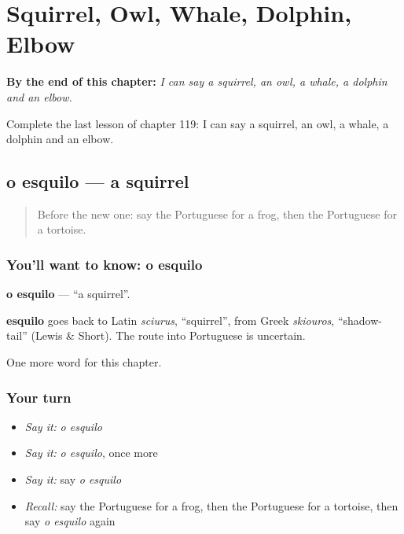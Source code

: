 
\chapter{Squirrel, Owl, Whale, Dolphin, Elbow}
\label{ch:pt-squirrel-owl-whale-dolphin-elbow}

\begin{chapteropening}
\textbf{By the end of this chapter:} \emph{I can say a squirrel, an owl, a whale, a dolphin and an elbow.}

Complete the last lesson of chapter 119: I can say a squirrel, an owl, a whale, a dolphin and an elbow.
\end{chapteropening}

\section[o esquilo]{o esquilo — a squirrel}

\label{lesson:PT-C119-esquilo}



\begin{quote}
Before the new one: say the Portuguese for a frog, then the Portuguese for a tortoise.
\end{quote}

\subsection*{You'll want to know: o esquilo}
\textbf{o esquilo} — \textquotedblleft{}a squirrel\textquotedblright{}.

\begin{cousinweb}
\textbf{esquilo} goes back to Latin \emph{sciurus}, \textquotedblleft{}squirrel\textquotedblright{}, from Greek \emph{skiouros}, \textquotedblleft{}shadow-tail\textquotedblright{} (Lewis \& Short). The route into Portuguese is uncertain.
\end{cousinweb}

\begin{grammarlens}[title={What you've built}]
One more word for this chapter.
\end{grammarlens}

\subsection*{Your turn}
\begin{itemize}
\raggedright
  \item \emph{Say it:} \emph{o esquilo}
  \item \emph{Say it:} \emph{o esquilo}, once more
  \item \emph{Say it:} say \emph{o esquilo}
  \item \emph{Recall:} say the Portuguese for a frog, then the Portuguese for a tortoise, then say \emph{o esquilo} again
\end{itemize}

